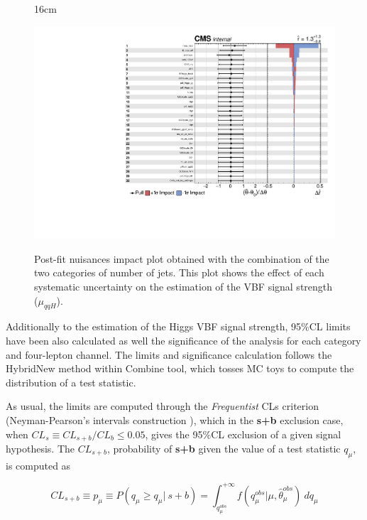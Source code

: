 \begin{figure}[hbtp]{16cm}
	\caption{Post-fit nuisances impact plot obtained with the combination of the two categories of number of jets. This plot shows the effect of each systematic uncertainty on the estimation of the VBF signal strength ($\mu_{qqH}$).}
	\centering
	\includegraphics[scale=1,angle=90]{ChapterAnalysis/figs/impacts_obs_4l_combination}
	\label{fig:vbf_impact_plot}
\end{figure}

Additionally to the estimation of the Higgs VBF signal strength, 95$\%$CL limits have been also calculated as well the significance of the analysis for each category and four-lepton channel. The limits and significance calculation follows the HybridNew method within Combine tool, which tosses MC toys to compute the distribution of a test statistic.

As usual, the limits are computed through the \textit{Frequentist} CLs criterion (Neyman-Pearson's intervals construction \cite{bib:GlenCowan,bib:Eilam-ESWB-2018-1,bib:Eilam-ESWB-2018-2}), which in the \textbf{s+b} exclusion case, when $CL_{s} \equiv CL_{s+b}/CL_{b} \leq 0.05$, gives the 95$\%$CL exclusion of a given signal hypothesis. The $CL_{s+b}$, probability of \textbf{s+b} given the value of a test statistic $q_{\mu}$, is computed as

\begin{equation}
\label{eq:clsb}
CL_{s+b} \equiv p_{\mu} \equiv P(q_{\mu} \geq q_{\mu} | ~s+b) = \int_{q_{\mu}^{obs}}^{+\infty} \mathit{f}(q_{\mu}^{obs} | \mu, \hat{\theta}_{\mu}^{obs}) ~dq_{\mu}
\end{equation}

